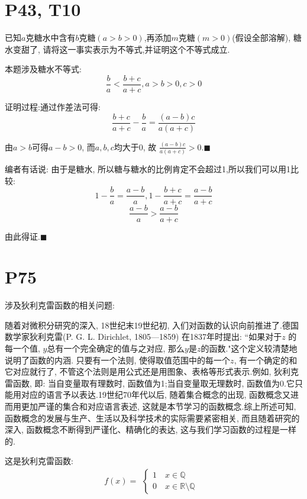 \documentclass{book}
\begin{document}
    \section{\textcolor[rgb]{0.11,0.65,0.52}{P43, T10}}
    \begin{boxB}
        已知$a$克糖水中含有$b$克糖$(a>b>0)$,再添加$m$克糖$(m>0)$(假设全部溶解), 糖水变甜了, 请将这一事实表示为不等式,并证明这个不等式成立.
    \end{boxB}

    本题涉及\textcolor[rgb]{0.38,0.11,0.2}{糖水不等式}:
    $$
    \frac{b}{a} < \frac{b+c}{a+c}, a>b>0, c>0
    $$

    证明过程:通过\textcolor[rgb]{0.75,0.17,0.22}{作差法}可得:
    $$
    \frac{b+c}{a+c} - \frac{b}{a} = \frac{(a-b)c}{a(a+c)}
    $$

    由$a>b$可得$a-b>0$, 而$a,b,c$均大于$0$, 故 $\displaystyle \frac{(a-b)c}{a(a+c)}>0. \blacksquare$

    编者有话说: 由于是糖水, 所以糖与糖水的比例肯定不会超过1,所以我们可以用1比较:
    $$
    1-\frac{b}{a}=\frac{a-b}{a},1-\frac{b+c}{a+c}=\frac{a-b}{a+c}
    $$
    $$
    \frac{a-b}{a}>\frac{a-b}{a+c}
    $$

    由此得证.$\blacksquare$

    \section{\textcolor[rgb]{0.11,0.65,0.52}{P75}}
    涉及\textcolor[rgb]{0.38,0.11,0.2}{狄利克雷函数}的相关问题:

    随着对微积分研究的深入, 18世纪末19世纪初, 入们对函数的认识向前推进了.德国数学家狄利克雷(P. G. L. Dirichlet, 1805—1859) 在1837年时提出: ``如果对于$z$ 的每一个值, $y$总有一个完全确定的值与之对应, 那么$y$是$z$的函数."这个定义较清楚地说明了函数的内涵. 只要有一个法则, 使得取值范围中的每一个$z$, 有一个确定的和它对应就行了, 不管这个法则是用公式还是用图象、表格等形式表示.例如, 狄利克雷函数, 即: 当自变量取有理数时, 函数值为1;当自变量取无理数时, 函数值为0.它只能用对应的语言予以表达.19世纪70年代以后, 随着集合概念的出现, 函数概念又进而用更加严谨的集合和对应语言表述, 这就是本节学习的函数概念.综上所述可知, 函数概念的发展与生产、生活以及科学技术的实际需要紧密相关, 而且随着研究的深入, 函数概念不断得到严谨化、精确化的表达, 这与我们学习函数的过程是一样的.

    这是\textcolor[rgb]{0.38,0.11,0.2}{狄利克雷函数}:
    $$
    f(x)=\begin{array}{l} 
            \left\{\begin{matrix} 
            1 \quad x \in \mathbb{Q} \\ 
            0 \quad x \in \mathbb{R} \setminus \mathbb{Q} \
          \end{matrix}\right.    
        \end{array} 
    $$
\end{document}
